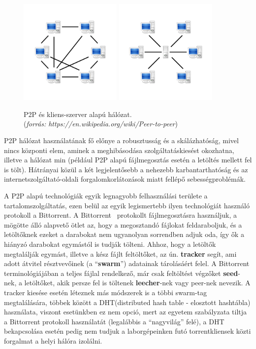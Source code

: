 \begin{figure}[ht]
	\centering
	\includegraphics[width=50mm, keepaspectratio]{figures/P2P-network.png}\hspace{1cm}
	\includegraphics[width=50mm, keepaspectratio]{figures/Server-based-network.png}
	\caption{P2P és kliens-szerver alapú hálózat. \\(\textit{forrás: https://en.wikipedia.org/wiki/Peer-to-peer})}
	\label{fig:networkcomparison}
\end{figure}

P2P hálózat használatának fő előnye a robusztusság és a skálázhatóság, mivel nincs központi elem,
aminek a meghibásodása szolgáltatáskiesést okozhatna, illetve a hálózat min (például P2P alapú fájlmegosztás esetén a letöltés mellett fel is tölt). Hátrányai közül a két legjelentősebb a nehezebb karbantarthatóság és az internetszolgáltató-oldali forgalomkorlátozások miatt fellépő sebességproblémák.

A P2P alapú technológiák egyik legnagyobb felhasználási területe a tartalomszolgáltatás, ezen belül
az egyik legismertebb ilyen technológiát használó protokoll a Bittorrent. A Bittorrent~\cite{cohen2008bittorrent} protokollt
fájlmegosztásra használjuk, a mögötte álló alapvető ötlet az, hogy a megosztandó fájlokat
feldaraboljuk, és a letöltőknek ezeket a darabokat nem ugyanolyan sorrendben adjuk oda, így ők a
hiányzó darabokat egymástól is tudják tölteni. Ahhoz, hogy a letöltők megtalálják egymást, illetve a kész fájlt feltöltőket, az ún. \textbf{tracker} segít, ami adott átvitel résztvevőinek (a ``\textbf{swarm}'') adatainak tárolásáért felel. A Bittorrent terminológiájában a teljes fájlal rendelkező, már csak feltöltést végzőket \textbf{seed}-nek, a letöltőket, akik persze fel is töltenek \textbf{leecher}-nek vagy peer-nek nevezik. A tracker kiesése esetén léteznek más módszerek is a többi swarm-tag megtalálására, többek között a DHT\cite{rescorla2006introduction}(distributed hash table - elosztott hashtábla) használata, viszont esetünkben ez nem opció, mert az egyetem szabályzata tiltja a Bittorrent protokoll használatát (legalábbis a ``nagyvilág'' felé), a DHT bekapcsolása esetén pedig nem tudjuk a laborgépeinken futó torrentkliensek közti forgalmat a helyi hálóra izolálni.

